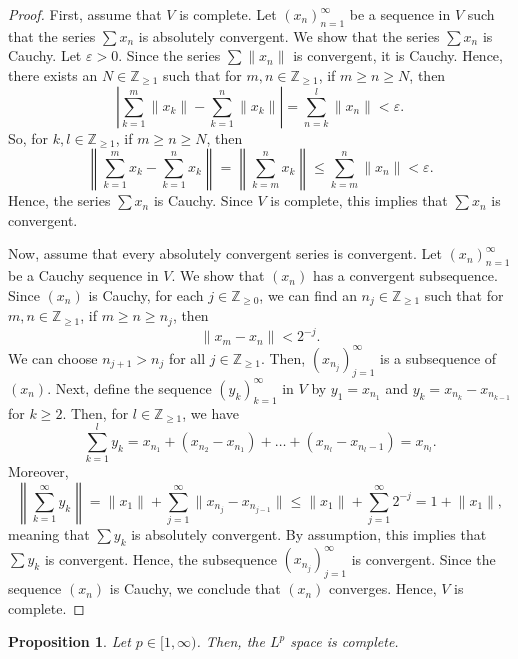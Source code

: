 \documentclass[a4paper, openany]{memoir}
\theoremstyle{definition}
\theoremstyle{plain}
\newtheorem{proposition}[definition]{Proposition}
\begin{document}
    \begin{proof}
        First, assume that $V$ is complete. Let $(x_n)_{n=1}^\infty$ be a sequence in $V$ such that the series $\sum x_n$ is absolutely convergent. We show that the series $\sum x_n$ is Cauchy. Let $\varepsilon > 0$. Since the series $\sum \lVert x_n \rVert$ is convergent, it is Cauchy. Hence, there exists an $N \in \mathbb{Z}_{\geq 1}$ such that for $m, n \in \mathbb{Z}_{\geq 1}$, if $m \geq n \geq N$, then
        \[\left|\sum_{k=1}^{m} \lVert x_k \rVert - \sum_{k=1}^{n} \lVert x_k \rVert \right| = \sum_{n=k}^{l} \lVert x_n \rVert < \varepsilon.\]
        So, for $k, l \in \mathbb{Z}_{\geq 1}$, if $m \geq n \geq N$, then
        \[\left\lVert\sum_{k=1}^{m} x_k - \sum_{k=1}^{n} x_k\right\rVert = \left\lVert \sum_{k=m}^{n} x_k \right\rVert \leq \sum_{k=m}^{n} \lVert x_n \rVert < \varepsilon.\]
        Hence, the series $\sum x_n$ is Cauchy. Since $V$ is complete, this implies that $\sum x_n$ is convergent.

        Now, assume that every absolutely convergent series is convergent. Let $(x_n)_{n=1}^\infty$ be a Cauchy sequence in $V$. We show that $(x_n)$ has a convergent subsequence. Since $(x_n)$ is Cauchy, for each $j \in \mathbb{Z}_{\geq 0}$, we can find an $n_j \in \mathbb{Z}_{\geq 1}$ such that for $m, n \in \mathbb{Z}_{\geq 1}$, if $m \geq n \geq n_j$, then 
        \[\lVert x_m - x_n \rVert < 2^{-j}.\]
        We can choose $n_{j+1} > n_j$ for all $j \in \mathbb{Z}_{\geq 1}$. Then, $(x_{n_j})_{j=1}^\infty$ is a subsequence of $(x_n)$. Next, define the sequence $(y_k)_{k=1}^\infty$ in $V$ by $y_1 = x_{n_1}$ and $y_k = x_{n_k} - x_{n_{k-1}}$ for $k \geq 2$. Then, for $l \in \mathbb{Z}_{\geq 1}$, we have
        \[\sum_{k=1}^l y_k = x_{n_1} + (x_{n_2} - x_{n_1}) + \dots + (x_{n_l} - x_{n_l-1}) = x_{n_l}.\]
        Moreover,
        \[\left\lVert \sum_{k=1}^\infty y_k \right\rVert = \lVert x_1 \rVert + \sum_{j=1}^\infty \lVert x_{n_j} - x_{n_{j-1}} \rVert \leq \lVert x_1 \rVert + \sum_{j=1}^{\infty} 2^{-j} = 1 + \lVert x_1 \rVert,\]
        meaning that $\sum y_k$ is absolutely convergent. By assumption, this implies that $\sum y_k$ is convergent. Hence, the subsequence $(x_{n_j})_{j=1}^\infty$ is convergent. Since the sequence $(x_n)$ is Cauchy, we conclude that $(x_n)$ converges. Hence, $V$ is complete.
    \end{proof}
    \begin{proposition}
        Let $p \in [1, \infty)$. Then, the $L^p$ space is complete.
    \end{proposition}
\end{document}
